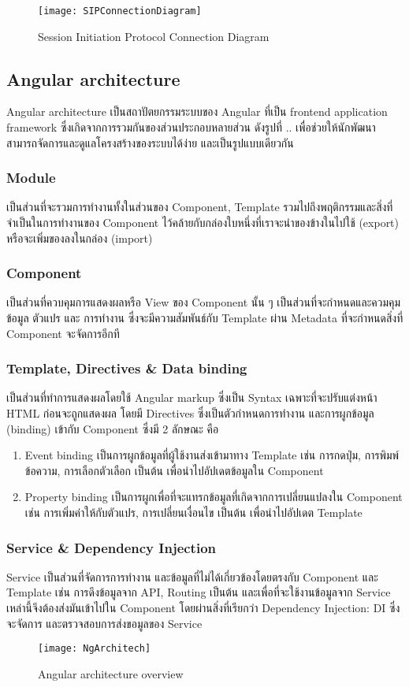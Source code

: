 \begin{figure}[h]
	\centering
	\texttt{[image: SIPConnectionDiagram]}
	\caption{Session Initiation Protocol Connection Diagram}
\end{figure}

\subsection{Angular architecture}
Angular architecture เป็นสถาปัตยกรรมระบบของ Angular ที่เป็น frontend application framework ซึ่งเกิดจากการรวมกันของส่วนประกอบหลายส่วน ดังรูปที่ .. เพื่อช่วยให้นักพัฒนาสามารถจัดการและดูแลโครงสร้างของระบบได้ง่าย และเป็นรูปแบบเดียวกัน

\setcounter{secnumdepth}{4} 
\subsubsection{Module} เป็นส่วนที่จะรวมการทำงานทั้งในส่วนของ Component, Template รวมไปถึงพฤติกรรมและสิ่งที่จำเป็นในการทำงานของ Component ไว้คล้ายกับกล่องใบหนึ่งที่เราจะนำของข้างในไปใช้ (export) หรือจะเพิ่มของลงในกล่อง (import)
\subsubsection{Component} 
เป็นส่วนที่ควบคุมการแสดงผลหรือ View ของ Component นั้น ๆ เป็นส่วนที่จะกำหนดและควมคุมข้อมูล ตัวแปร และ การทำงาน ซึ่งจะมีความสัมพันธ์กับ Template ผ่าน Metadata ที่จะกำหนดสิ่งที่ Component จะจัดการอีกที
\subsubsection{Template, Directives \& Data binding} 
เป็นส่วนที่ทำการแสดงผลโดยใช้ Angular markup ซึ่งเป็น Syntax เฉพาะที่จะปรับแต่งหน้า HTML ก่อนจะถูกแสดงผล โดยมี Directives ซึ่งเป็นตัวกำหนดการทำงาน และการผูกข้อมูล (binding) เข้ากับ Component ซึ่งมี 2 ลักษณะ คือ
\begin{enumerate}
	\item Event binding เป็นการผูกข้อมูลที่ผู้ใช้งานส่งเข้ามาทาง Template เช่น การกดปุ่ม, การพิมพ์ข้อความ, การเลือกตัวเลือก เป็นต้น เพื่อนำไปอัปเดตข้อมูลใน Component
	\item Property binding เป็นการผูกเพื่อที่จะแทรกข้อมูลที่เกิดจากการเปลี่ยนแปลงใน Component เช่น การเพิ่มค่าให้กับตัวแปร, การเปลี่ยนเงื่อนไข เป็นต้น เพื่อนำไปอัปเดต Template

\end{enumerate}
\subsubsection{Service \& Dependency Injection} 
Service เป็นส่วนที่จัดการการทำงาน และข้อมูลที่ไม่ได้เกี่ยวข้องโดยตรงกับ Component และ Template เช่น การดึงข้อมูลจาก API, Routing เป็นต้น และเพื่อที่จะใช้งานข้อมูลจาก Service เหล่านี้จึงต้องส่งมันเข้าไปใน Component โดยผ่านสิ่งที่เรียกว่า Dependency Injection: DI ซึ่งจะจัดการ และตรวจสอบการส่งขอมูลของ Service
\begin{figure}[h]
	\centering
	\texttt{[image: NgArchitech]}
	\caption{Angular architecture overview}
\end{figure}

